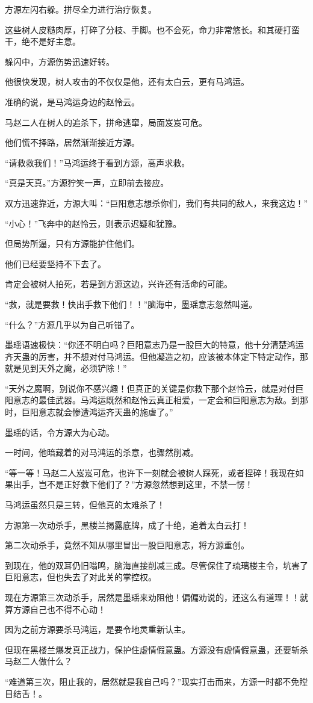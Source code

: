 \begin{this_body}
方源左闪右躲。拼尽全力进行治疗恢复。

这些树人皮糙肉厚，打碎了分枝、手脚。也不会死，命力非常悠长。和其硬打蛮干，绝不是好主意。

躲闪中，方源伤势迅速好转。

他很快发现，树人攻击的不仅仅是他，还有太白云，更有马鸿运。

准确的说，是马鸿运身边的赵怜云。

马赵二人在树人的追杀下，拼命逃窜，局面岌岌可危。

他们慌不择路，居然渐渐接近方源。

“请救救我们！”马鸿运终于看到方源，高声求救。

“真是天真。”方源狞笑一声，立即前去接应。

双方迅速靠近，方源大叫：“巨阳意志想杀你们，我们有共同的敌人，来我这边！”

“小心！”飞奔中的赵怜云，则表示迟疑和犹豫。

但局势所逼，只有方源能护住他们。

他们已经要坚持不下去了。

肯定会被树人拍死，若是到方源这边，兴许还有活命的可能。

“救，就是要救！快出手救下他们！！”脑海中，墨瑶意志忽然叫道。

“什么？”方源几乎以为自己听错了。

墨瑶语速极快：“你还不明白吗？巨阳意志乃是一股巨大的特意，他十分清楚鸿运齐天蛊的厉害，并不想对付马鸿运。但他凝造之初，应该被本体定下特定动作，那就是见到天外之魔，必须铲除！”

“天外之魔啊，别说你不感兴趣！但真正的关键是你救下那个赵怜云，就是对付巨阳意志的最佳武器。马鸿运既然和赵怜云真正相爱，一定会和巨阳意志为敌。到那时，巨阳意志就会惨遭鸿运齐天蛊的施虐了。”

墨瑶的话，令方源大为心动。

一时间，他暗藏着的对马鸿运的杀意，也骤然削减。

“等一等！马赵二人岌岌可危，也许下一刻就会被树人踩死，或者捏碎！我现在如果出手，岂不是正好救下他们了？”方源忽然想到这里，不禁一愣！

马鸿运虽然只是三转，但他真的太难杀了！

方源第一次动杀手，黑楼兰揭露底牌，成了十绝，追着太白云打！

第二次动杀手，竟然不知从哪里冒出一股巨阳意志，将方源重创。

到现在，他的双耳仍旧嗡鸣，脑海直接削减三成。尽管保住了琉璃楼主令，坑害了巨阳意志，但也失去了对此关的掌控权。

现在方源第三次动杀手，居然是墨瑶来劝阻他！偏偏劝说的，还这么有道理！！就算方源自己也不得不心动！

因为之前方源要杀马鸿运，是要令地灵重新认主。

但现在黑楼兰爆发真正战力，保护住虚情假意蛊。方源没有虚情假意蛊，还要斩杀马赵二人做什么？

“难道第三次，阻止我的，居然就是我自己吗？”现实打击而来，方源一时都不免瞠目结舌！。

\end{this_body}

